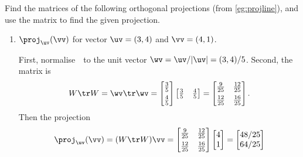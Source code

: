 \begin{example} \label{eg:projlinem}
Find the matrices of the following orthogonal projections (from \autoref{eg:projline}), and use the matrix to find the given projection.
\begin{enumerate}
\item \(\proj_\uv(\vv)\) for vector \(\uv=(3,4)\) and \(\vv=(4,1)\).
\begin{solution} 
First, normalise~\uv\ to the unit vector \(\wv=\uv/|\uv|=(3,4)/5\). Second, the matrix is
\begin{equation*}
W\tr W=\wv\tr\wv=\begin{bmatrix} \frac35\\[1ex] \frac45 \end{bmatrix}\begin{bmatrix} \frac35&\frac45 \end{bmatrix}
=\begin{bmatrix} \frac9{25}&\frac{12}{25}\\[1ex]
\frac{12}{25}&\frac{16}{25} \end{bmatrix}.
\end{equation*}
Then the projection
\begin{equation*}
\proj_\uv(\vv) =(W\tr W)\vv
=\begin{bmatrix} \frac9{25}&\frac{12}{25}\\[1ex]
\frac{12}{25}&\frac{16}{25} \end{bmatrix}\begin{bmatrix} 4\\1 \end{bmatrix}
=\begin{bmatrix} 48/25\\64/25 \end{bmatrix}
\end{equation*}
\end{solution}


\end{enumerate}
\end{example}
